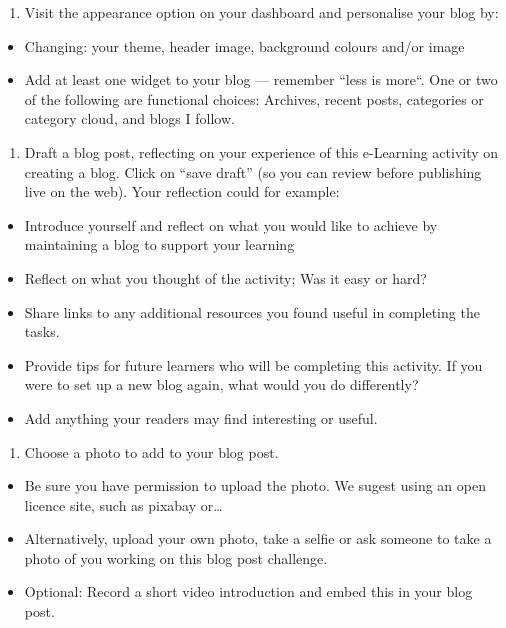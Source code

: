 \documentclass[
]{book}
\providecommand{\tightlist}{%
  \setlength{\itemsep}{0pt}\setlength{\parskip}{0pt}}
\theoremstyle{definition}
\theoremstyle{definition}
\theoremstyle{definition}
\theoremstyle{definition}
\theoremstyle{remark}
\begin{document}
\begin{reflect}
\begin{enumerate}
\def\labelenumi{\arabic{enumi}.}
\tightlist
\item
  Visit the appearance option on your dashboard and personalise your blog by:
\end{enumerate}

\begin{itemize}
\tightlist
\item
  Changing: your theme, header image, background colours and/or image
\item
  Add at least one widget to your blog --- remember ``less is more``. One or two of the following are functional choices: Archives, recent posts, categories or category cloud, and blogs I follow.
\end{itemize}

\begin{enumerate}
\def\labelenumi{\arabic{enumi}.}
\tightlist
\item
  Draft a blog post, reflecting on your experience of this e-Learning activity on creating a blog.
  Click on ``save draft'' (so you can review before publishing live on the web). Your reflection could for example:
\end{enumerate}

\begin{itemize}
\tightlist
\item
  Introduce yourself and reflect on what you would like to achieve by maintaining a blog to support your learning
\item
  Reflect on what you thought of the activity; Was it easy or hard?
\item
  Share links to any additional resources you found useful in completing the tasks.
\item
  Provide tips for future learners who will be completing this activity. If you were to set up a new blog again, what would you do differently?
\item
  Add anything your readers may find interesting or useful.
\end{itemize}

\begin{enumerate}
\def\labelenumi{\arabic{enumi}.}
\tightlist
\item
  Choose a photo to add to your blog post.
\end{enumerate}

\begin{itemize}
\tightlist
\item
  Be sure you have permission to upload the photo. We sugest using an open licence site, such as pixabay or\ldots{}
\item
  Alternatively, upload your own photo, take a selfie or ask someone to take a photo of you working on this blog post challenge.
\item
  Optional: Record a short video introduction and embed this in your blog post.
\end{itemize}


\end{reflect}
\end{document}
